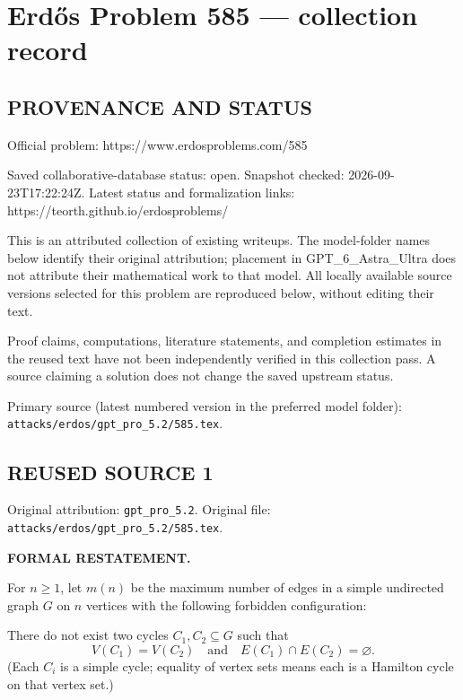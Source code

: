 \section*{Erd\H{o}s Problem 585 --- collection record}

\subsection*{PROVENANCE AND STATUS}
Official problem: https://www.erdosproblems.com/585

Saved collaborative-database status: open.
Snapshot checked: 2026-09-23T17:22:24Z.
Latest status and formalization links: https://teorth.github.io/erdosproblems/

This is an attributed collection of existing writeups. The model-folder names below identify their original attribution; placement in GPT\_6\_Astra\_Ultra does not attribute their mathematical work to that model. All locally available source versions selected for this problem are reproduced below, without editing their text.

Proof claims, computations, literature statements, and completion estimates in the reused text have not been independently verified in this collection pass. A source claiming a solution does not change the saved upstream status.

Primary source (latest numbered version in the preferred model folder): \texttt{attacks/erdos/gpt\_pro\_5.2/585.tex}.

\subsection*{REUSED SOURCE 1}
Original attribution: \texttt{gpt\_pro\_5.2}.
Original file: \texttt{attacks/erdos/gpt\_pro\_5.2/585.tex}.


\noindent\textbf{FORMAL RESTATEMENT.}

For $n\ge 1$, let $m(n)$ be the maximum number of edges in a simple undirected graph $G$ on $n$ vertices with the following forbidden configuration:

There do not exist two cycles $C_1,C_2\subseteq G$ such that
\[
V(C_1)=V(C_2)\quad\text{and}\quad E(C_1)\cap E(C_2)=\varnothing.
\]
(Each $C_i$ is a simple cycle; equality of vertex sets means each is a Hamilton cycle on that vertex set.)

